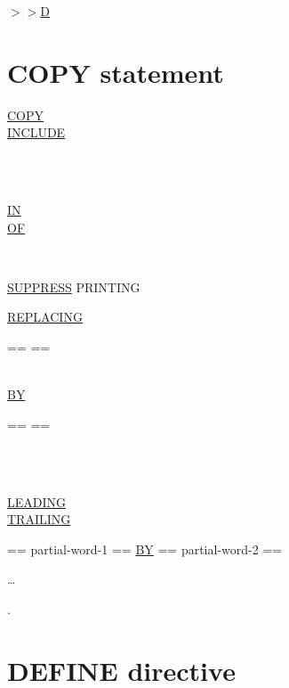 \documentclass[a4paper,oneside,svgnames]{scrbook}
\makeatletter
\newcommand{\key}[1]{\underline{#1}}
\newcommand{\directiveindicator}[0]{$>\!>$}
\newcommand{\deleted}[1]{%
  \colorbox{red!75}{#1}}
\newcommand{\gnucobol}[1]{%
  \colorbox{orange!75}{#1}}
\newenvironment{0-1}{$\left[ \begin{tabular}{@{}l@{}}}{\end{tabular} \right]$}
\newenvironment{1=}{$\left\{ \begin{tabular}{@{}l@{}}}{\end{tabular} \right\}$}
\makeatother
\begin{document}
\gnucobol{\directiveindicator\key{D} \sourcetext}

\section{COPY statement}

\begin{1=}
  \key{COPY} \\
  \deleted{\key{INCLUDE}}
\end{1=}
\begin{1=}
  \literal \\
  \textname \\
\end{1=}
\begin{0-1}
  \begin{1=}
    \key{IN} \\
    \key{OF}
  \end{1=}
  \begin{1=}
    \literal \\
    \libraryname
  \end{1=}
\end{0-1}

\begin{0-1}
  \key{SUPPRESS} PRINTING
\end{0-1}

\begin{0-1}
  \key{REPLACING}
  \begin{1=}
    \begin{1=}
      == \pseudotext == \\
      \identifier \\
      \literal
    \end{1=}
    \key{BY}
    \begin{1=}
      == \pseudotext == \\
      \identifier \\
      \literal
    \end{1=} \\

    \begin{1=}
      \key{LEADING} \\
      \key{TRAILING}
    \end{1=}
    == partial-word-1 ==
    \key{BY}
    == partial-word-2 ==
  \end{1=}\ldots
\end{0-1}
.

\section{DEFINE directive}
\end{document}
